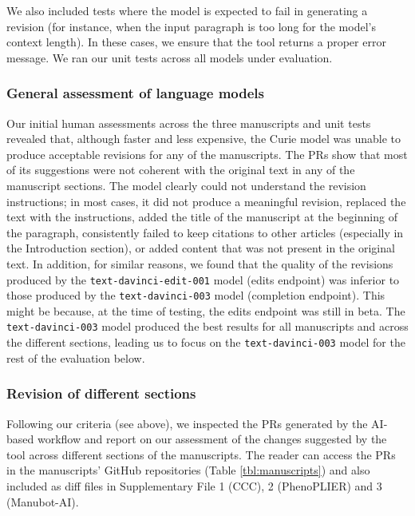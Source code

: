 \documentclass[
]{article}
\begin{document}
We also included tests where the model is expected to fail in generating a revision (for instance, when the input paragraph is too long for the model's context length).
In these cases, we ensure that the tool returns a proper error message.
We ran our unit tests across all models under evaluation.

\hypertarget{general-assessment-of-language-models}{%
\subsubsection{General assessment of language models}\label{general-assessment-of-language-models}}

Our initial human assessments across the three manuscripts and unit tests revealed that, although faster and less expensive, the Curie model was unable to produce acceptable revisions for any of the manuscripts.
The PRs show that most of its suggestions were not coherent with the original text in any of the manuscript sections.
The model clearly could not understand the revision instructions; in most cases, it did not produce a meaningful revision, replaced the text with the instructions, added the title of the manuscript at the beginning of the paragraph, consistently failed to keep citations to other articles (especially in the Introduction section), or added content that was not present in the original text.
In addition, for similar reasons, we found that the quality of the revisions produced by the \texttt{text-davinci-edit-001} model (edits endpoint) was inferior to those produced by the \texttt{text-davinci-003} model (completion endpoint).
This might be because, at the time of testing, the edits endpoint was still in beta.
The \texttt{text-davinci-003} model produced the best results for all manuscripts and across the different sections, leading us to focus on the \texttt{text-davinci-003} model for the rest of the evaluation below.

\hypertarget{revision-of-different-sections}{%
\subsubsection{Revision of different sections}\label{revision-of-different-sections}}

Following our criteria (see above), we inspected the PRs generated by the AI-based workflow and report on our assessment of the changes suggested by the tool across different sections of the manuscripts.
The reader can access the PRs in the manuscripts' GitHub repositories (Table \ref{tbl:manuscripts}) and also included as diff files in Supplementary File 1 (CCC), 2 (PhenoPLIER) and 3 (Manubot-AI).
\end{document}
